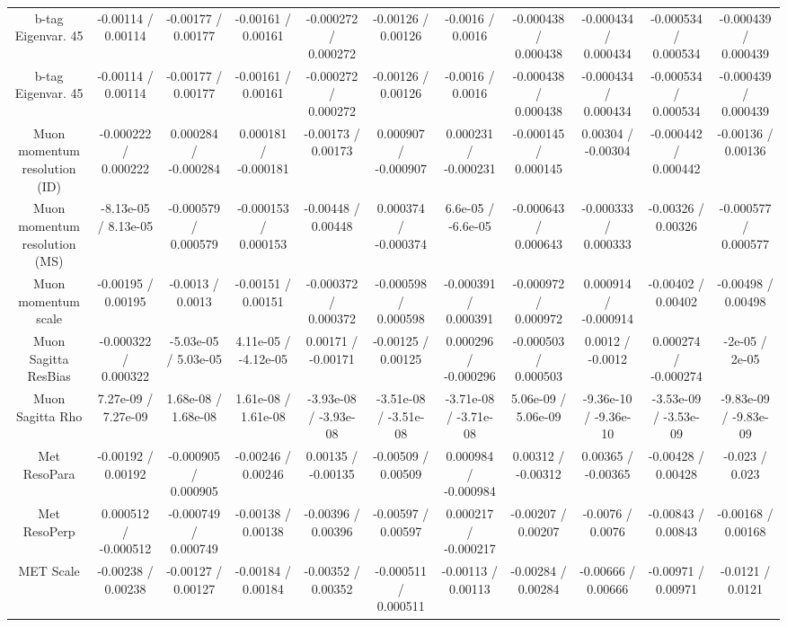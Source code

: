\begin{table}[htbp]
\begin{center}
\begin{tabular}{|c|c|c|c|c|c|c|c|c|c|c|}
  b-tag Eigenvar. 45 & -0.00114 / 0.00114 & -0.00177 / 0.00177 & -0.00161 / 0.00161 & -0.000272 / 0.000272 & -0.00126 / 0.00126 & -0.0016 / 0.0016 & -0.000438 / 0.000438 & -0.000434 / 0.000434 & -0.000534 / 0.000534 & -0.000439 / 0.000439 \\ 
  b-tag Eigenvar. 45 & -0.00114 / 0.00114 & -0.00177 / 0.00177 & -0.00161 / 0.00161 & -0.000272 / 0.000272 & -0.00126 / 0.00126 & -0.0016 / 0.0016 & -0.000438 / 0.000438 & -0.000434 / 0.000434 & -0.000534 / 0.000534 & -0.000439 / 0.000439 \\ 
  Muon momentum resolution (ID) & -0.000222 / 0.000222 & 0.000284 / -0.000284 & 0.000181 / -0.000181 & -0.00173 / 0.00173 & 0.000907 / -0.000907 & 0.000231 / -0.000231 & -0.000145 / 0.000145 & 0.00304 / -0.00304 & -0.000442 / 0.000442 & -0.00136 / 0.00136 \\ 
  Muon momentum resolution (MS) & -8.13e-05 / 8.13e-05 & -0.000579 / 0.000579 & -0.000153 / 0.000153 & -0.00448 / 0.00448 & 0.000374 / -0.000374 & 6.6e-05 / -6.6e-05 & -0.000643 / 0.000643 & -0.000333 / 0.000333 & -0.00326 / 0.00326 & -0.000577 / 0.000577 \\ 
  Muon momentum scale & -0.00195 / 0.00195 & -0.0013 / 0.0013 & -0.00151 / 0.00151 & -0.000372 / 0.000372 & -0.000598 / 0.000598 & -0.000391 / 0.000391 & -0.000972 / 0.000972 & 0.000914 / -0.000914 & -0.00402 / 0.00402 & -0.00498 / 0.00498 \\ 
  Muon Sagitta ResBias & -0.000322 / 0.000322 & -5.03e-05 / 5.03e-05 & 4.11e-05 / -4.12e-05 & 0.00171 / -0.00171 & -0.00125 / 0.00125 & 0.000296 / -0.000296 & -0.000503 / 0.000503 & 0.0012 / -0.0012 & 0.000274 / -0.000274 & -2e-05 / 2e-05 \\ 
  Muon Sagitta Rho & 7.27e-09 / 7.27e-09 & 1.68e-08 / 1.68e-08 & 1.61e-08 / 1.61e-08 & -3.93e-08 / -3.93e-08 & -3.51e-08 / -3.51e-08 & -3.71e-08 / -3.71e-08 & 5.06e-09 / 5.06e-09 & -9.36e-10 / -9.36e-10 & -3.53e-09 / -3.53e-09 & -9.83e-09 / -9.83e-09 \\ 
  Met ResoPara & -0.00192 / 0.00192 & -0.000905 / 0.000905 & -0.00246 / 0.00246 & 0.00135 / -0.00135 & -0.00509 / 0.00509 & 0.000984 / -0.000984 & 0.00312 / -0.00312 & 0.00365 / -0.00365 & -0.00428 / 0.00428 & -0.023 / 0.023 \\ 
  Met ResoPerp & 0.000512 / -0.000512 & -0.000749 / 0.000749 & -0.00138 / 0.00138 & -0.00396 / 0.00396 & -0.00597 / 0.00597 & 0.000217 / -0.000217 & -0.00207 / 0.00207 & -0.0076 / 0.0076 & -0.00843 / 0.00843 & -0.00168 / 0.00168 \\ 
  MET Scale & -0.00238 / 0.00238 & -0.00127 / 0.00127 & -0.00184 / 0.00184 & -0.00352 / 0.00352 & -0.000511 / 0.000511 & -0.00113 / 0.00113 & -0.00284 / 0.00284 & -0.00666 / 0.00666 & -0.00971 / 0.00971 & -0.0121 / 0.0121 \\ 

\end{tabular}
\end{center}
\end{table}
